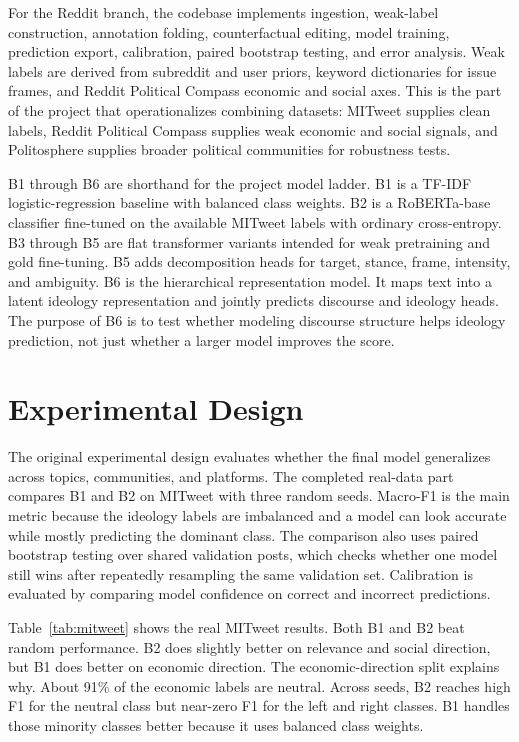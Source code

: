 \documentclass[11pt,twocolumn]{article}
\begin{document}
For the Reddit branch, the codebase implements ingestion, weak-label construction, annotation folding, counterfactual editing, model training, prediction export, calibration, paired bootstrap testing, and error analysis. Weak labels are derived from subreddit and user priors, keyword dictionaries for issue frames, and Reddit Political Compass economic and social axes. This is the part of the project that operationalizes combining datasets: MITweet supplies clean labels, Reddit Political Compass supplies weak economic and social signals, and Politosphere supplies broader political communities for robustness tests.

B1 through B6 are shorthand for the project model ladder. B1 is a TF-IDF logistic-regression baseline with balanced class weights. B2 is a RoBERTa-base classifier fine-tuned on the available MITweet labels with ordinary cross-entropy. B3 through B5 are flat transformer variants intended for weak pretraining and gold fine-tuning. B5 adds decomposition heads for target, stance, frame, intensity, and ambiguity. B6 is the hierarchical representation model. It maps text into a latent ideology representation and jointly predicts discourse and ideology heads. The purpose of B6 is to test whether modeling discourse structure helps ideology prediction, not just whether a larger model improves the score.

\section{Experimental Design}

The original experimental design evaluates whether the final model generalizes across topics, communities, and platforms. The completed real-data part compares B1 and B2 on MITweet with three random seeds. Macro-F1 is the main metric because the ideology labels are imbalanced and a model can look accurate while mostly predicting the dominant class. The comparison also uses paired bootstrap testing over shared validation posts, which checks whether one model still wins after repeatedly resampling the same validation set. Calibration is evaluated by comparing model confidence on correct and incorrect predictions.

Table~\ref{tab:mitweet} shows the real MITweet results. Both B1 and B2 beat random performance. B2 does slightly better on relevance and social direction, but B1 does better on economic direction. The economic-direction split explains why. About 91\% of the economic labels are neutral. Across seeds, B2 reaches high F1 for the neutral class but near-zero F1 for the left and right classes. B1 handles those minority classes better because it uses balanced class weights.
\end{document}
